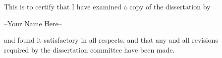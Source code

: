 \pagestyle{plain}

{}
\begin{center}

\normalsize

\vspace{1cm}

This is to certify that I have examined a copy of the dissertation by

\vspace{.75cm}

--Your Name Here--


\vspace{.75cm}

and found it satisfactory in all respects, 
and that any and all revisions \\ required by the
dissertation committee have been made.

\end{center}

\vspace{1.5cm}

